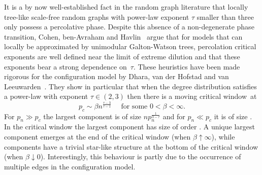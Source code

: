\documentclass[12pt,a4paper]{article}
\numberwithin{equation}{section}
\begin{document}
It is a by now well-established fact in the random graph literature that locally tree-like scale-free random graphs with power-law exponent $\tau$ smaller than three only possess a percolative phase. Despite this absence of a non-degenerate phase transition, Cohen, ben-Avraham and Havlin~\cite{cbh} argue that for models that can locally be approximated by unimodular Galton-Watson trees, percolation critical exponents are
well defined near the limit of extreme dilution and that these exponents bear a strong dependence on~$\tau$. These heuristics have been made rigorous for the configuration model 
by Dhara, van der Hofstad and van Leeuwarden~\cite{DHL}. They show in particular that
when the degree distribution satisfies a power-law with exponent
$\tau\in(2,3)$ then there is a moving critical window~at
$$p_c\sim \beta n^{\frac{\tau-3}{\tau-1}} \quad\text{ for some $0<\beta<\infty$.}$$
For $p_n\gg p_c$ the largest component is of size $np_n^{\frac1{3-\tau}}$ and for
$p_n\ll p_c$ it is of size . In the critical window the largest component has size of order .
A unique largest component emerges at the end of the critical window (when $\beta\uparrow\infty$), while components have a trivial star-like structure at the bottom of the critical
window (when $\beta\downarrow0$). Interestingly, this behaviour is partly due to the occurrence of multiple edges in the configuration model.
\smallskip
\pagebreak[3]
\end{document}
